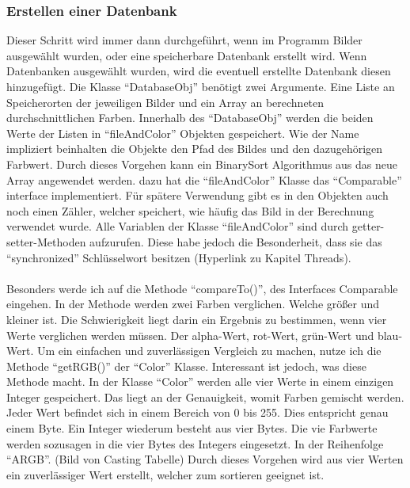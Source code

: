\subsubsection{Erstellen einer Datenbank}
Dieser Schritt wird immer dann durchgeführt, wenn im Programm Bilder ausgewählt wurden, oder eine speicherbare Datenbank erstellt wird. Wenn Datenbanken ausgewählt wurden, wird die eventuell erstellte Datenbank diesen hinzugefügt. Die Klasse ``DatabaseObj'' benötigt zwei Argumente. Eine Liste an Speicherorten der jeweiligen Bilder und ein Array an berechneten durchschnittlichen Farben. Innerhalb des ``DatabaseObj'' werden die beiden Werte der Listen in ``fileAndColor'' Objekten gespeichert. Wie der Name impliziert beinhalten die Objekte den Pfad des Bildes und den dazugehörigen Farbwert. Durch dieses Vorgehen kann ein BinarySort Algorithmus aus das neue Array angewendet werden. dazu hat die ``fileAndColor'' Klasse das ``Comparable'' interface implementiert. Für spätere Verwendung gibt es in den Objekten auch noch einen Zähler, welcher speichert, wie häufig das Bild in der Berechnung verwendet wurde. Alle Variablen der Klasse ``fileAndColor'' sind durch getter- setter-Methoden aufzurufen. Diese habe jedoch die Besonderheit, dass sie das ``synchronized'' Schlüsselwort besitzen (Hyperlink zu Kapitel Threads).\\
\\
Besonders werde ich auf die Methode ``compareTo()'', des Interfaces Comparable eingehen. In der Methode werden zwei Farben verglichen. Welche größer und kleiner ist. Die Schwierigkeit liegt darin ein Ergebnis zu bestimmen, wenn vier Werte verglichen werden müssen. Der alpha-Wert, rot-Wert, grün-Wert und blau-Wert. Um ein einfachen und zuverlässigen Vergleich zu machen, nutze ich die Methode ``getRGB()'' der ``Color'' Klasse. Interessant ist jedoch, was diese Methode macht. In der Klasse ``Color'' werden alle vier Werte in einem einzigen Integer gespeichert. Das liegt an der Genauigkeit, womit Farben gemischt werden. Jeder Wert befindet sich in einem Bereich von 0 bis 255. Dies entspricht genau einem Byte. Ein Integer wiederum besteht aus vier Bytes. Die vie Farbwerte werden sozusagen in die vier Bytes des Integers eingesetzt. In der Reihenfolge ``ARGB''. (Bild von Casting Tabelle) Durch dieses Vorgehen wird aus vier Werten ein zuverlässiger Wert erstellt, welcher zum sortieren geeignet ist.